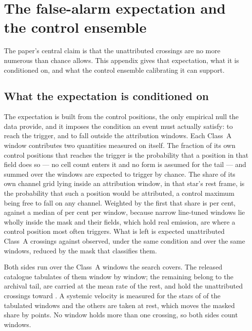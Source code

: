 \section{The false-alarm expectation and the control ensemble}
\label{app:falsealarm}

The paper's central claim is that the unattributed crossings are no more
numerous than chance allows. This appendix gives that expectation, what it is
conditioned on, and what the control ensemble calibrating it can support.

\subsection{What the expectation is conditioned on}

The expectation is built from the control positions, the only empirical null
the data provide, and it imposes the condition an event must actually satisfy:
to reach the trigger, and to fall outside the attribution windows. Each
Class~A window contributes two quantities measured on itself. The fraction of
its own \NCtrl{} control positions that reaches the trigger is the probability
that a position in that field does so --- no cell count enters it and no form
is assumed for the tail --- and summed over the windows \CeExpTrig{} are
expected to trigger by chance. The share of its own channel grid lying inside
an attribution window, in that star's rest frame, is the probability that such
a position would be attributed, a control maximum being free to fall on any
channel. Weighted by the first that share is \CeMaskPct{} per cent, against a
median of \CeMaskPctMed{} per cent per window, because \CeNFullMask{} narrow
line-tuned windows lie wholly inside the mask and their fields, which hold
real emission, are where a control position most often triggers. What is left
is \CeExp{} expected unattributed Class~A crossings against \CeObs{}
observed, under the same condition and over the same windows, reduced by the
mask that classifies them.

Both sides run over the \CeNWin{} Class~A windows the search covers. The
released catalogue tabulates \CeNWinRel{} of them window by window; the
remaining \CeNWinTail{} belong to the archival tail, are carried at the mean
rate of the rest, and hold the \CeNTailCrossWord{} unattributed crossings
toward \CeTailStar. A systemic velocity is measured for the stars of
\CeNVsys{} of the tabulated windows and the others are taken at rest, which
moves the masked share by \CeVsysSensPct{} points. No window holds more than one crossing, so both
sides count windows.


